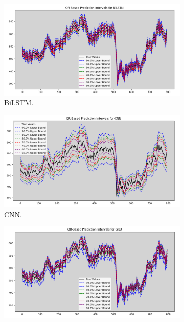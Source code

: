 \begin{figure}[H]
    \centering
        \begin{minipage}{0.6\textwidth}
            \centering
            \begin{subfigure}[b]{1.0\textwidth}
                \centering
                \includegraphics[width=\textwidth]{Chap02/figs/QR_BiLSTM_AxisBank_Original.png}
                \caption{BiLSTM.}
            \end{subfigure}
            \hfill
            \begin{subfigure}[b]{1.0\textwidth}
                \centering
                \includegraphics[width=\textwidth]{Chap02/figs/QR_CNN_AxisBank.png}
                \caption{CNN.}
            \end{subfigure}
            \begin{subfigure}[b]{1.0\textwidth}
                \centering
                \includegraphics[width=\textwidth]{Chap02/figs/QR_GRU_AxisBank.png}

\end{subfigure}
\end{minipage}
\end{figure}

